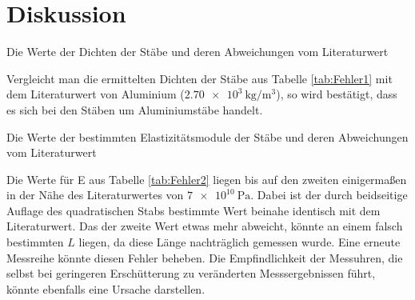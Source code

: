 
\section{Diskussion}
\label{sec:Diskussion}

\begin{table}
	\centering
	\caption{Die Werte der Dichten der Stäbe und deren Abweichungen vom Literaturwert}
	
	\label{tab:Fehler1}
\end{table}
\noindent Vergleicht man die ermittelten Dichten der Stäbe aus Tabelle \ref{tab:Fehler1} mit dem Literaturwert von Aluminium ($\SI{2,70e3}{\kilogram\per\cubic\metre}$\cite{Dichte}), so wird bestätigt, dass es sich bei den Stäben um Aluminiumstäbe handelt.

\begin{table}
	\centering
	\caption{Die Werte der bestimmten Elastizitätsmodule der Stäbe und deren Abweichungen vom Literaturwert}
	
	\label{tab:Fehler2}
\end{table}

\noindent Die Werte für E aus Tabelle \ref{tab:Fehler2} liegen bis auf den zweiten einigermaßen in der Nähe des Literaturwertes von $\SI{7e10}{\pascal}$\cite{ElastizitaetsmodulAlu}.
Dabei ist der durch beidseitige Auflage des quadratischen Stabs bestimmte Wert beinahe identisch mit dem Literaturwert. Das der zweite Wert etwas mehr abweicht, könnte an einem falsch bestimmten $L$ liegen, da diese Länge nachträglich gemessen wurde. Eine erneute Messreihe könnte diesen Fehler beheben. 
Die Empfindlichkeit der Messuhren, die selbst bei geringeren Erschütterung zu veränderten Messsergebnissen führt, könnte ebenfalls eine Ursache darstellen.
